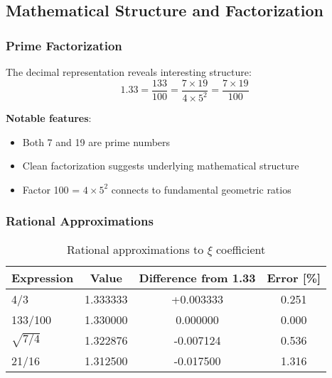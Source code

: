\documentclass[12pt,a4paper]{article}
\newcommand{\mytimes}{\ensuremath{\times}}
\begin{document}
			\subsection{Mathematical Structure and Factorization}
			\label{subsec:mathematical_structure}
			
			\subsubsection{Prime Factorization}
			\label{subsubsec:prime_factorization}
			
			The decimal representation reveals interesting structure:
			\begin{equation}
				1.33 = \frac{133}{100} = \frac{7 \mytimes 19}{4 \mytimes 5^2} = \frac{7 \mytimes 19}{100}
				\label{eq:factorization}
			\end{equation}
			
			\textbf{Notable features}:
			\begin{itemize}
				\item Both 7 and 19 are prime numbers
				\item Clean factorization suggests underlying mathematical structure
				\item Factor 100 = $4 \mytimes 5^2$ connects to fundamental geometric ratios
			\end{itemize}
			
			\subsubsection{Rational Approximations}
			\label{subsubsec:rational_approximations}
			
			\begin{table}[htbp]
				\centering
				\begin{tabular}{lccc}
					\toprule
					\textbf{Expression} & \textbf{Value} & \textbf{Difference from 1.33} & \textbf{Error [\%]} \\
					\midrule
					4/3 & 1.333333 & +0.003333 & 0.251 \\
					133/100 & 1.330000 & 0.000000 & 0.000 \\
					$\sqrt{7/4}$ & 1.322876 & -0.007124 & 0.536 \\
					21/16 & 1.312500 & -0.017500 & 1.316 \\
					\bottomrule
				\end{tabular}
				\caption{Rational approximations to $\xi$ coefficient}
				\label{tab:rational_approximations}
			\end{table}
	
\end{document}
